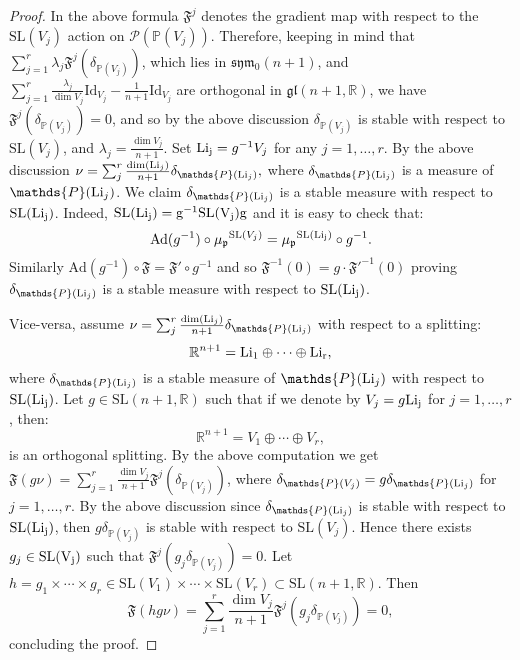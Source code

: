 \documentclass[leqno,11pt, a4]{amsart}
\theoremstyle{named}
\begin{document}
\begin{proof}
In the above formula ${\mathfrak{F}}^j$ denotes the gradient map with respect to the $\mathrm{SL}(V_j)$ action on
${\mathscr{P}} ( \mathds{P}(V_j))$. Therefore, keeping in mind that $\sum_{j=1}^r \lambda_j {\mathfrak{F}}^j (\delta_{\mathds{P}(V_j)})$, which lies in $\mathfrak{sym_0}(n+1)$, and $\sum_{j=1}^r \frac{\lambda_j}{\dim V_j}\mathrm{Id}_{V_j} - \frac{1}{n+1} \mathrm{Id}_{V_j}$ are orthogonal in $\mathfrak{gl}(n+1,{\mathbb{R}})$, we have ${\mathfrak{F}}^j (\delta_{\mathds{P}(V_j)})=0$, and so by the above discussion $\delta_{\mathds{P}(V_j)}$ is stable with respect to $\mathrm{SL}(V_j) $, and $\lambda_j=\frac{ \dim V_j }{n+1}$. Set ${\rm Li_j}=g^{-1} V_j$ for any $j=1,\ldots,r$. By the above discussion $\nu=\sum_{j}^r\frac{\dim({\rm Li}_j)}{n+1}\delta_{\mathds{P}({\rm Li}_j)},
$
where $\delta_{\mathds{P}({\rm Li}_j)}$ is a measure of $\mathds{P}({\rm Li}_j)$. We claim $\delta_{\mathds{P}({\rm Li}_j)}$ is a stable measure with respect to $\rm{SL}({\rm Li}_j )$. Indeed,
$\rm{SL}({\rm Li}_j )=g^{-1}\mathrm{SL}(V_j)g$ and it is easy to check that:
\[
\mathrm{Ad}(g^{-1})\circ {\mu_{\mathfrak{p}}}^{\mathrm{SL}(V_j)}={\mu_{\mathfrak{p}}}^{\mathrm{SL}(\rm{Li}_j)} \circ g^{-1}.
\]
Similarly $\mathrm{Ad}(g^{-1}) \circ {\mathfrak{F}}={\mathfrak{F}}'\circ g^{-1}$ and so
${\mathfrak{F}}^{-1}(0)=g\cdot {\mathfrak{F}}'^{-1}(0)$ proving  $\delta_{\mathds{P}({\rm Li}_j)}$ is a stable measure with respect to $\rm{SL}({\rm Li}_j )$.

Vice-versa, assume $\nu=\sum_{j}^r\frac{\dim({\rm Li}_j)}{n+1}\delta_{\mathds{P}({\rm Li}_j)}
$ with respect to a splitting:
\[
{\mathbb{R}}^{n+1}={\rm Li_1} \oplus \cdots \oplus {\rm Li_r},
\]
where $\delta_{\mathds{P}({\rm Li}_j)}$ is a stable measure of $\mathds{P}({\rm Li}_j)$ with respect to $\rm{SL}({\rm Li}_j )$.
Let $g\in \mathrm{SL}(n+1,{\mathbb{R}})$ such that if we denote by $V_j=g{\rm Li_j}$ for $j=1,\ldots,r$, then:
\[
{\mathbb{R}}^{n+1}=V_1 \oplus \cdots \oplus V_r,
\]
is an orthogonal splitting. By the above computation we get ${\mathfrak{F}} (g\nu)=\sum_{j=1}^r \frac{ \dim V_j }{n+1} {\mathfrak{F}}^j (\delta_{\mathds{P}(V_j)})$, where $\delta_{\mathds{P}(V_j)}=g\delta_{\mathds{P}({\rm Li}_j)}$ for $j=1,\ldots,r$. By the above discussion since $\delta_{\mathds{P}({\rm Li}_j)}$ is stable with respect to $\rm{SL}({\rm Li}_j )$, then $g\delta_{\mathds{P}(V_j)}$ is stable with respect to $\mathrm{SL}(V_j)$. Hence there exists $g_j \in \rm{SL}(V_j)$ such that ${\mathfrak{F}}^j (g_j  \delta_{\mathds{P}(V_j)})=0$. Let $h=g_1\times \cdots \times g_r \in \mathrm{SL} (V_1) \times \cdots \times \mathrm{SL} (V_r )\subset \mathrm{SL}(n+1,{\mathbb{R}})$. Then
\[
{\mathfrak{F}}(hg\nu)=\sum_{j=1}^r \frac{ \dim V_j }{n+1} {\mathfrak{F}}^j (g_j\delta_{\mathds{P}(V_j)})=0,
\]
concluding the proof.
\end{proof}
\end{document}
